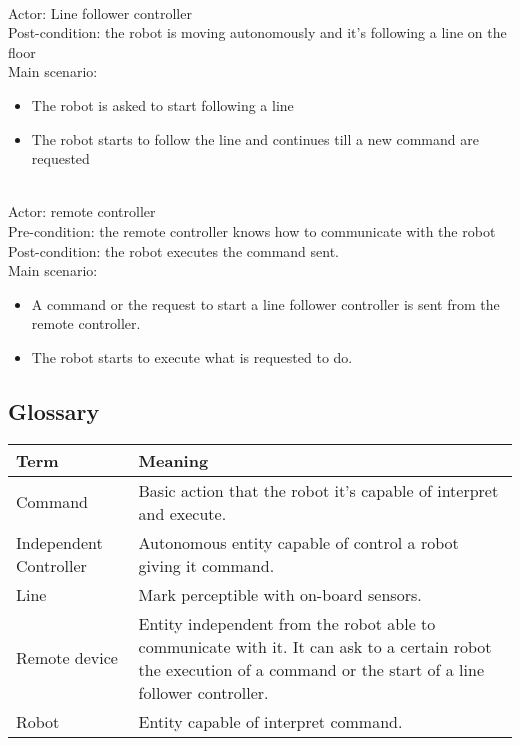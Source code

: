 \documentclass{llncs}
\begin{document}
\\
Actor: Line follower controller\\
Post-condition: the robot is moving autonomously and it's following a line on the floor\\
Main scenario:
\begin{itemize}
	\item The robot is asked to start following a line
	\item The robot starts to follow the line and continues till a new command are requested
\end{itemize}

\\
Actor: remote controller\\
Pre-condition: the remote controller knows how to communicate with the robot\\
Post-condition: the robot executes the command sent.\\
Main scenario:
\begin{itemize}
	\item A command or the request to start a line follower controller is sent from the remote controller.
	\item The robot starts to execute what is requested to do.
\end{itemize}
 



\subsection{Glossary}
\begin{center}
	\begin{tabular}{| p{} | p{}|}
		\hline
 		\textbf{Term }         &  \textbf{Meaning}   \\
		\hline
		Command &Basic action that the robot it's capable of interpret and execute. \\
		\hline
		Independent Controller &Autonomous entity capable of control a robot giving it command. \\
		\hline 
		Line  &Mark perceptible with on-board sensors. \\
		\hline
		Remote device  &Entity independent from the robot able to communicate with it. It can ask to a certain robot the execution of a command or the start of a line follower controller. \\
		\hline
		Robot   &Entity capable of interpret command. \\
		\hline
	\end{tabular}
\end{center}
\end{document}
